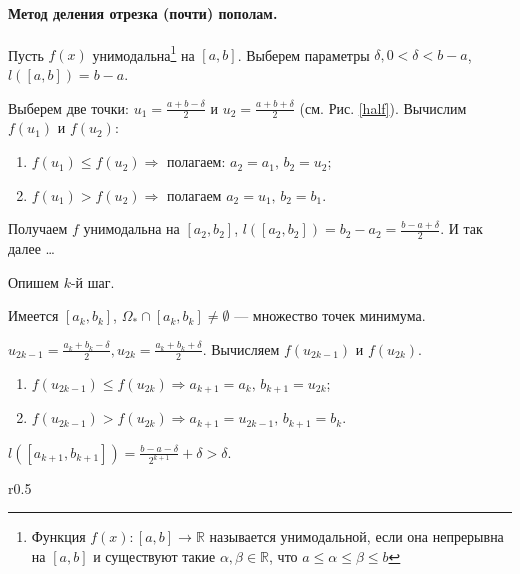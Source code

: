 
\paragraph{Метод деления отрезка (почти) пополам.}  Пусть $f(x)$ унимодальна\footnote{Функция $f(x): [a, b] \to \mathbb{R}$ называется унимодальной, если она непрерывна на $[a, b]$ и существуют такие $\alpha, \beta \in \mathbb{R}$, что $a \leqslant \alpha \leqslant \beta \leqslant b$} на $[a, b]$. Выберем параметры $\delta, 0 < \delta < b - a$, $l([a, b]) = b - a$.
\newline

Выберем две точки: $u_1 = \frac{a + b - \delta}{2}$ и $u_2 = \frac{a + b + \delta}{2}$ (см. Рис. \ref{half}).  Вычислим $f(u_1)$ и $f(u_2)$: 
\begin{enumerate}[label={\arabic*)}]
	\item $f(u_1) \leqslant f(u_2) \Rightarrow$ полагаем: $a_2 = a_1, \, b_2 = u_2$;
	\item $f(u_1 ) > f(u_2) \Rightarrow$ полагаем $a_2 = u_1, \, b_2 = b_1$.
\end{enumerate}

Получаем $f$ унимодальна на $[a_2, b_2]$, $l([a_2, b_2]) = b_2 - a_2 = \frac{b - a + \delta}{2}$. И так далее \dots
\newline

Опишем $k$-й шаг.

Имеется $[a_k, b_k]$, $\Omega_{\ast} \cap [a_k, b_k] \not = \emptyset$ --- множество точек минимума.

$u_{2 k - 1} = \frac{a_k + b_k - \delta}{2}, u_{2 k} = \frac{a_k + b_k + \delta}{2}$. Вычисляем $f(u_{2 k - 1})$ и $f(u_{2 k})$.
\begin{enumerate}[label={\arabic*)}]
	\item  $f(u_{2 k - 1}) \leqslant f(u_{2 k}) \Rightarrow a_{k + 1} = a_k, \, b_{k + 1} = u_{2 k}$;
	\item $f(u_{2 k - 1}) > f(u_{2 k}) \Rightarrow a_{k + 1} = u_{2 k - 1}, \, b_{k + 1} = b_k$.  
\end{enumerate}

$l([a_{k + 1}, b_{k + 1}]) = \frac{b - a - \delta}{2^{k + 1}} + \delta > \delta$.
\newline

\begin{wrapfigure}[10]{r}{0.5\linewidth}
	\centering
	
	\caption{Иллюстрация первого шага.}
	\label{half}
\end{wrapfigure}

